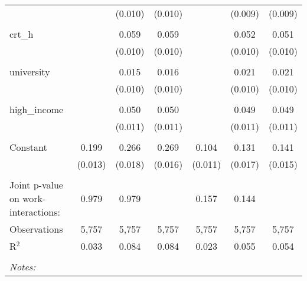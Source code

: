 \begin{table}[!htbp]
\begin{tabular}{@{\extracolsep{5pt}}lcccccc}
  &  & (0.010) & (0.010) &  & (0.009) & (0.009) \\ 
  & & & & & & \\ 
 crt\_h &  & 0.059 & 0.059 &  & 0.052 & 0.051 \\ 
  &  & (0.010) & (0.010) &  & (0.010) & (0.010) \\ 
  & & & & & & \\ 
 university &  & 0.015 & 0.016 &  & 0.021 & 0.021 \\ 
  &  & (0.010) & (0.010) &  & (0.010) & (0.010) \\ 
  & & & & & & \\ 
 high\_income &  & 0.050 & 0.050 &  & 0.049 & 0.049 \\ 
  &  & (0.011) & (0.011) &  & (0.011) & (0.011) \\ 
  & & & & & & \\ 
 Constant & 0.199 & 0.266 & 0.269 & 0.104 & 0.131 & 0.141 \\ 
  & (0.013) & (0.018) & (0.016) & (0.011) & (0.017) & (0.015) \\ 
  & & & & & & \\ 
Joint p-value on work-interactions: & 0.979 & 0.979 &  & 0.157 & 0.144 &  \\ 
Observations & 5,757 & 5,757 & 5,757 & 5,757 & 5,757 & 5,757 \\ 
R$^{2}$ & 0.033 & 0.084 & 0.084 & 0.023 & 0.055 & 0.054 \\ 
\hline \\[-1.8ex] 
\textit{Notes:} & \multicolumn{6}{l}{} \\ 
\end{tabular} 
\end{table} 
